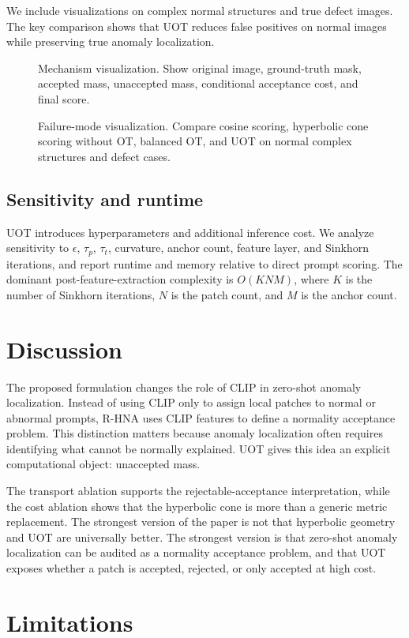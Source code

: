 \documentclass[10pt]{article}
\newcommand{\method}{R-HNA}
\newcommand{\figtodo}[1]{\textcolor{red}{[FIGURE TODO: #1]}}
\newcommand{\placeholderfigure}[2]{
\begin{figure}[t]
    \centering
    \fbox{
    \begin{minipage}[c][0.18\textheight][c]{0.92\linewidth}
        \centering
        \figtodo{#1}
    \end{minipage}}
    \caption{#2}
    \label{fig:#1}
\end{figure}
}
\begin{document}
We include visualizations on complex normal structures and true defect images.
The key comparison shows that UOT reduces false positives on normal images while preserving true anomaly localization.

\placeholderfigure{mechanism}{Mechanism visualization. Show original image, ground-truth mask, accepted mass, unaccepted mass, conditional acceptance cost, and final score.}
\placeholderfigure{failure}{Failure-mode visualization. Compare cosine scoring, hyperbolic cone scoring without OT, balanced OT, and UOT on normal complex structures and defect cases.}

\subsection{Sensitivity and runtime}

UOT introduces hyperparameters and additional inference cost.
We analyze sensitivity to $\epsilon$, $\tau_p$, $\tau_t$, curvature, anchor count, feature layer, and Sinkhorn iterations, and report runtime and memory relative to direct prompt scoring.
The dominant post-feature-extraction complexity is $O(KNM)$, where $K$ is the number of Sinkhorn iterations, $N$ is the patch count, and $M$ is the anchor count.

\section{Discussion}

The proposed formulation changes the role of CLIP in zero-shot anomaly localization.
Instead of using CLIP only to assign local patches to normal or abnormal prompts, \method{} uses CLIP features to define a normality acceptance problem.
This distinction matters because anomaly localization often requires identifying what cannot be normally explained.
UOT gives this idea an explicit computational object: unaccepted mass.

The transport ablation supports the rejectable-acceptance interpretation, while the cost ablation shows that the hyperbolic cone is more than a generic metric replacement.
The strongest version of the paper is not that hyperbolic geometry and UOT are universally better.
The strongest version is that zero-shot anomaly localization can be audited as a normality acceptance problem, and that UOT exposes whether a patch is accepted, rejected, or only accepted at high cost.

\section{Limitations}
\end{document}

